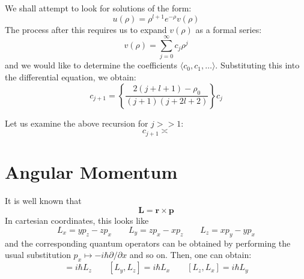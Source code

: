 We shall attempt to look for solutions of the form:
\begin{equation*}
    u(\rho) = \rho^{l + 1}e^{-\rho}v(\rho)
\end{equation*}
The process after this requires us to expand $v(\rho)$ as a formal series:
\begin{equation*}
    v(\rho) = \sum_{j=0}^\infty c_j\rho^j
\end{equation*}
and we would like to determine the coefficients $\langle c_0, c_1,\ldots\rangle$. Substituting this into the differential equation, we obtain:
\begin{equation*}
    c_{j + 1} = \left\{\frac{2(j + l + 1) - \rho_0}{(j + 1)(j + 2l + 2)}\right\}c_j
\end{equation*}

Let us examine the above recursion for $j >> 1$:
\begin{equation*}
    c_{j + 1}\asymp
\end{equation*}





































\section{Angular Momentum}
It is well known that 
\begin{equation*}
    \mathbf{L} = \mathbf{r}\times\mathbf{p}
\end{equation*}
In cartesian coordinates, this looks like
\begin{equation*}
    L_x = yp_z - zp_x \qquad L_y = zp_x - xp_z \qquad L_z = xp_y - yp_x
\end{equation*}
and the corresponding quantum operators can be obtained by performing the usual substitution $p_x\mapsto -i\hbar\partial/\partial x$ and so on. Then, one can obtain:
\begin{equation*}
    [L_x, L_y] = i\hbar L_z \qquad [L_y, L_z] = i\hbar L_x \qquad [L_z, L_x] = i\hbar L_y
\end{equation*}

